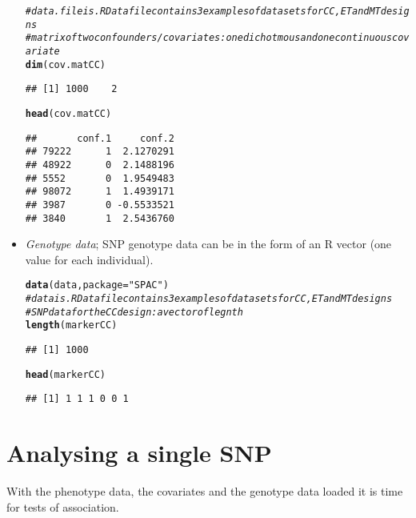 \documentclass{article}\usepackage[]{graphicx}\usepackage[]{color}
\makeatletter
\newcommand{\hlstr}[1]{\textcolor[rgb]{0.192,0.494,0.8}{#1}}%
\newcommand{\hlcom}[1]{\textcolor[rgb]{0.678,0.584,0.686}{\textit{#1}}}%
\newcommand{\hlstd}[1]{\textcolor[rgb]{0.345,0.345,0.345}{#1}}%
\newcommand{\hlkwc}[1]{\textcolor[rgb]{0.333,0.667,0.333}{#1}}%
\newcommand{\hlkwd}[1]{\textcolor[rgb]{0.737,0.353,0.396}{\textbf{#1}}}%
\newenvironment{kframe}{%
 \def\at@end@of@kframe{}%
 \ifinner\ifhmode%
  \def\at@end@of@kframe{\end{minipage}}%
  \begin{minipage}{\columnwidth}%
 \fi\fi%
 \def\FrameCommand##1{\hskip\@totalleftmargin \hskip-\fboxsep
 \colorbox{shadecolor}{##1}\hskip-\fboxsep
     \hskip-\linewidth \hskip-\@totalleftmargin \hskip\columnwidth}%
 \MakeFramed {\advance\hsize-\width
   \@totalleftmargin\z@ \linewidth\hsize
   \@setminipage}}%
 {\par\unskip\endMakeFramed%
 \at@end@of@kframe}
\newenvironment{knitrout}{}{} %
\makeatother
\begin{document}
\begin{itemize}
\begin{knitrout}
\begin{kframe}
\begin{alltt}
\hlcom{# data.file is .RData file contains 3 examples of data sets for CC, ET and MT designs}
\hlcom{# matrix of two confounders/covariates: one dichotmous and one continuous covariate}
  \hlkwd{dim}\hlstd{(cov.matCC)}
\end{alltt}
\begin{verbatim}
## [1] 1000    2
\end{verbatim}
\begin{alltt}
  \hlkwd{head}\hlstd{(cov.matCC)}
\end{alltt}
\begin{verbatim}
##       conf.1     conf.2
## 79222      1  2.1270291
## 48922      0  2.1488196
## 5552       0  1.9549483
## 98072      1  1.4939171
## 3987       0 -0.5533521
## 3840       1  2.5436760
\end{verbatim}
\end{kframe}
\end{knitrout}
\item \emph{Genotype data}; SNP genotype data can be in the form of
  an R vector (one value for each individual).
\begin{knitrout}
\color{fgcolor}\begin{kframe}
\begin{alltt}
   \hlkwd{data}\hlstd{(data,}\hlkwc{package}\hlstd{=}\hlstr{"SPAC"}\hlstd{)}
\hlcom{# data is .RData file contains 3 examples of data sets for CC, ET and MT designs}
\hlcom{# SNP data for the CC design: a vector of legnth}
  \hlkwd{length}\hlstd{(markerCC)}
\end{alltt}
\begin{verbatim}
## [1] 1000
\end{verbatim}
\begin{alltt}
  \hlkwd{head}\hlstd{(markerCC)}
\end{alltt}
\begin{verbatim}
## [1] 1 1 1 0 0 1
\end{verbatim}
\end{kframe}
\end{knitrout}
\end{itemize}

\section{Analysing a single SNP}
\label{sec:analys-single-SNP}
With the phenotype data, the covariates and the genotype data loaded it is time for tests of association.
\end{document}
